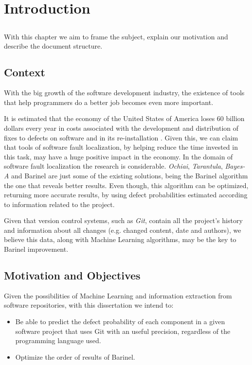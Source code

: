 \chapter{Introduction} \label{chap:intro}

\section*{}

With this chapter we aim to frame the subject, explain our motivation and describe the document structure.

\section{Context} \label{sec:context}

With the big growth of the software development industry, the existence of tools that help programmers do a better job becomes even more important.

It is estimated that the economy of the United States of America loses 60 billion dollars every year in costs associated with the development and distribution of fixes to defects on software and in its re-installation \cite{Zhivich2009}. Given this, we can claim that tools of software fault localization, by helping reduce the time invested in this task, may have a huge positive impact in the economy. In the domain of software fault localization the research is considerable. \emph{Ochiai}, \emph{Tarantula}, \emph{Bayes-A} and Barinel are just some of the existing solutions, being the Barinel algorithm the one that reveals better results.
Even though, this algorithm can be optimized, returning more accurate results, by using defect probabilities estimated according to information related to the project.

Given that version control systems, such as \emph{Git}, contain all the project's history and information about all changes (e.g. changed content, date and authors), we believe this data, along with Machine Learning algorithms, may be the key to Barinel improvement.

\section{Motivation and Objectives} \label{sec:goals}

Given the possibilities of Machine Learning and information extraction from software repositories, with this dissertation we intend to:
%
\begin{itemize}
\item Be able to predict the defect probability of each component in a given software project that uses Git with an useful precision, regardless of the programming language used.
\item Optimize the order of results of Barinel.
\end{itemize}

